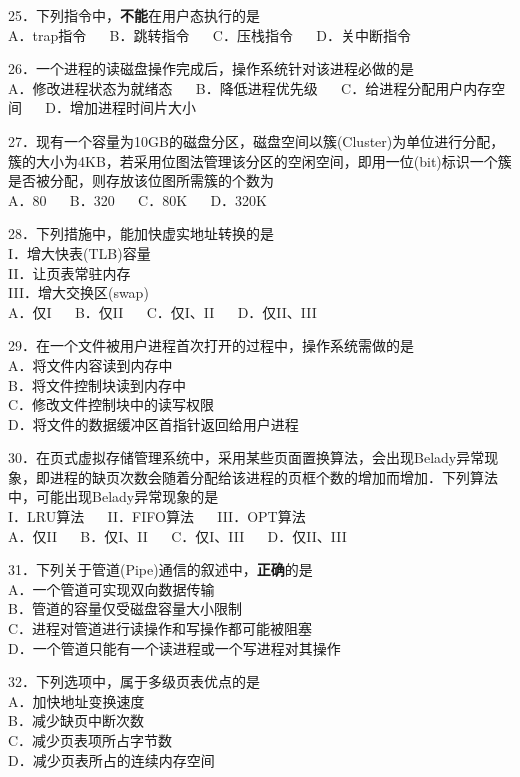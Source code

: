 25．下列指令中，\textbf{不能}在用户态执行的是 \\
A．trap指令 $\quad$ B．跳转指令 $\quad$ C．压栈指令 $\quad$ D．关中断指令

26．一个进程的读磁盘操作完成后，操作系统针对该进程必做的是 \\
A．修改进程状态为就绪态 $\quad$ B．降低进程优先级 $\quad$ C．给进程分配用户内存空间 $\quad$ D．增加进程时间片大小

27．现有一个容量为10GB的磁盘分区，磁盘空间以簇(Cluster)为单位进行分配，簇的大小为4KB，若采用位图法管理该分区的空闲空间，即用一位(bit)标识一个簇是否被分配，则存放该位图所需簇的个数为 \\
A．80 $\quad$ B．320 $\quad$ C．80K $\quad$ D．320K

28．下列措施中，能加快虚实地址转换的是 \\
I．增大快表(TLB)容量 \\
II．让页表常驻内存 \\
III．增大交换区(swap) \\
A．仅I $\quad$ B．仅II $\quad$ C．仅I、II $\quad$ D．仅II、III

29．在一个文件被用户进程首次打开的过程中，操作系统需做的是 \\
A．将文件内容读到内存中 \\
B．将文件控制块读到内存中 \\
C．修改文件控制块中的读写权限 \\
D．将文件的数据缓冲区首指针返回给用户进程

30．在页式虚拟存储管理系统中，采用某些页面置换算法，会出现Belady异常现象，即进程的缺页次数会随着分配给该进程的页框个数的增加而增加．下列算法中，可能出现Belady异常现象的是 \\
I．LRU算法 $\quad$ II．FIFO算法 $\quad$ III．OPT算法 \\
A．仅II $\quad$ B．仅I、II $\quad$ C．仅I、III $\quad$ D．仅II、III

31．下列关于管道(Pipe)通信的叙述中，\textbf{正确}的是 \\
A．一个管道可实现双向数据传输 \\
B．管道的容量仅受磁盘容量大小限制 \\
C．进程对管道进行读操作和写操作都可能被阻塞 \\
D．一个管道只能有一个读进程或一个写进程对其操作

32．下列选项中，属于多级页表优点的是 \\
A．加快地址变换速度 \\
B．减少缺页中断次数 \\
C．减少页表项所占字节数 \\
D．减少页表所占的连续内存空间

